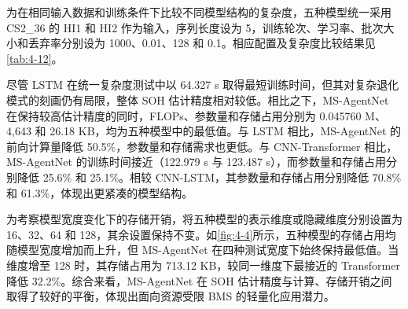 为在相同输入数据和训练条件下比较不同模型结构的复杂度，五种模型统一采用 CS2\_36 的 HI1 和 HI2 作为输入，序列长度设为 5，训练轮次、学习率、批次大小和丢弃率分别设为 1000、0.01、128 和 0.1。相应配置及复杂度比较结果见\cref{tab:4-12}。

尽管 LSTM 在统一复杂度测试中以 64.327 s 取得最短训练时间，但其对复杂退化模式的刻画仍有局限，整体 SOH 估计精度相对较低。相比之下，MS-AgentNet 在保持较高估计精度的同时，FLOPs、参数量和存储占用分别为 0.045760 M、4,643 和 26.18 KB，均为五种模型中的最低值。与 LSTM 相比，MS-AgentNet 的前向计算量降低 50.5\%，参数量和存储需求也更低。与 CNN-Transformer 相比，MS-AgentNet 的训练时间接近（122.979 s 与 123.487 s），而参数量和存储占用分别降低 25.6\% 和 25.1\%。相较 CNN-LSTM，其参数量和存储占用分别降低 70.8\% 和 61.3\%，体现出更紧凑的模型结构。

为考察模型宽度变化下的存储开销，将五种模型的表示维度或隐藏维度分别设置为 16、32、64 和 128，其余设置保持不变。如\cref{fig:4-4}所示，五种模型的存储占用均随模型宽度增加而上升，但 MS-AgentNet 在四种测试宽度下始终保持最低值。当维度增至 128 时，其存储占用为 713.12 KB，较同一维度下最接近的 Transformer 降低 32.2\%。综合来看，MS-AgentNet 在 SOH 估计精度与计算、存储开销之间取得了较好的平衡，体现出面向资源受限 BMS 的轻量化应用潜力。




